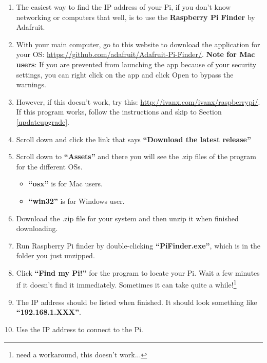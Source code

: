 \documentclass{article}
\begin{document}
\begin{enumerate}
  \item The easiest way to find the IP address of your Pi, if you don't know networking or computers that well, is to use the \textbf{Raspberry Pi Finder} by Adafruit. 
  \item With your main computer, go to this website to download the application for your OS: \newline \newline \url{https://github.com/adafruit/Adafruit-Pi-Finder/}.\newline \newline
\textbf{Note for Mac users}: If you are prevented from launching the app because of your security settings, you can right click on the app and click Open to bypass the warnings.
  \item However, if this doesn't work, try this: \newline \newline \url{http://ivanx.com/ivanx/raspberrypi/}. \newline \newline If this program works, follow the instructions and skip to Section \ref{updateupgrade}. 
  
  \item Scroll down and click the link that says \textbf{``Download the latest release''}
  \item Scroll down to \textbf{``Assets''} and there you will see the .zip files of the program for the different OSs.
  \begin{itemize}
    \item \textbf{``osx''} is for Mac users.
    \item \textbf{``win32''} is for Windows user.
  \end{itemize}
  \item Download the .zip file for your system and then unzip it when finished downloading.
  \item Run Raspberry Pi finder by double-clicking \textbf{``PiFinder.exe''}, which is in the folder you just unzipped.
  \item Click \textbf{``Find my Pi!''} for the program to locate your Pi. Wait a few minutes if it doesn't find it immediately. Sometimes it can take quite a while!\footnote{need a workaround, this doesn't work...}
  \item The IP address should be listed when finished. It should look something like \textbf{``192.168.1.XXX''}. \label{ipaddress}
  \item Use the IP address to connect to the Pi.
\end{enumerate}
\end{document}
